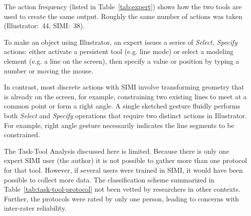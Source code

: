 The action frequency (listed in Table~\ref{tab:expert}) shows how the
two tools are used to create the same output. Roughly the same number
of actions was taken (Illustrator:~44, SIMI:~38).

To make an object using Illustrator, an expert issues a series of
\textit{Select, Specify} actions: either activate a persistent tool
(e.g. line mode) or select a modeling element (e.g. a line on the
screen), then specify a value or position by typing a number or moving
the mouse.

In contrast, most discrete actions with SIMI involve transforming
geometry that is already on the screen, for example, constraining two
existing lines to meet at a common point or form a right angle. A
single sketched gesture fluidly performs both \textit{Select} and
\textit{Specify} operations that require two distinct actions in
Illustrator. For example, right angle gesture necessarily indicates
the line segments to be constrained.

The Task-Tool Analysis discussed here is limited. Because there is
only one expert SIMI user (the author) it is not possible to gather
more than one protocol for that tool. However, if several users were
trained in SIMI, it would have been possible to collect more data.
The classification scheme summarized in
Table~\ref{tab:task-tool-protocol} not been vetted by researchers in
other contexts. Further, the protocols were rated by only one person,
leading to concerns with inter-rater reliability.

